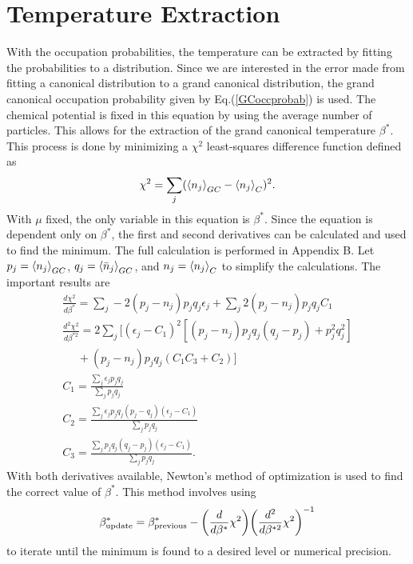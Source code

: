 \section{Temperature Extraction}
\label{section:TemperatureExtraction}
With the occupation probabilities, the temperature can be extracted by fitting the probabilities to a distribution. Since we are interested in the error made from fitting a canonical distribution to a grand canonical distribution, the grand canonical occupation probability given by Eq.\@ (\ref{GCoccprobab}) is used. The chemical potential is fixed in this equation by using the average number of particles. This allows for the extraction of the grand canonical temperature $\beta^*$. This process is done by minimizing a $\chi^2$ least-squares difference function defined as 
\begin{equation}
    \chi^2=\sum_j(\left<{n_j}\right>_{GC}-\left<{n_j}\right>_C)^2. \label{chisq}
\end{equation}
With $\mu$ fixed, the only variable in this equation is $\beta^*$. Since the equation is dependent only on $\beta^*$, the first and second derivatives can be calculated and used to find the minimum. The full calculation is performed in Appendix B. Let $p_j=\left<{n_j}\right>_{GC}$, $q_j=\left<{\bar{n}_j}\right>_{GC}$, and $n_j=\left<{n_j}\right>_C$ to simplify the calculations. The important results are 
\begin{gather}
    \frac{d\chi^2}{d\beta^*}=\sum_j -2(p_j-n_j)p_j q_j \epsilon_j+\sum_j 2(p_j-n_j)p_j q_j C_1\\
    \frac{d^2\chi^2}{d\beta^{*2}}=2\sum_j\Biggr[(\epsilon_j-C_1)^2[(p_j-n_j)p_jq_j(q_j-p_j)+p_j^2q_j^2]\nonumber\\
    \ \ \ \ \ \ +(p_j-n_j)p_jq_j(C_1C_3+C_2)\Biggr]\\
    C_1=\frac{\sum_j \epsilon_j p_j q_j}{\sum_j p_j q_j}\\
    C_2=\frac{\sum_j \epsilon_j p_j q_j(p_j - q_j)(\epsilon_j-C_1)}{\sum_j p_j q_j}\\
    C_3=\frac{\sum_j p_j q_j(q_j-p_j)(\epsilon_j-C_1)}{\sum_j p_j q_j}.
\end{gather}
With both derivatives available, Newton's method of optimization is used to find the correct value of $\beta^*$. This method involves using 
\begin{equation}
    \beta_{\text{update}}^*=\beta_{\text{previous}}^*-\qty(\frac{d}{d\beta^*}\chi^2)\qty({\frac{d^2}{d\beta^{*2}}\chi^2})^{-1}
\end{equation}
to iterate until the minimum is found to a desired level or numerical precision.

